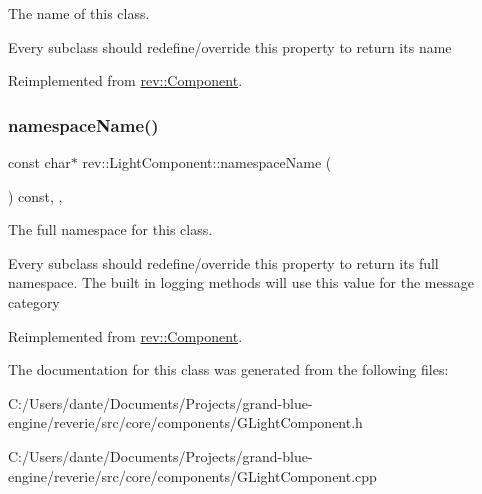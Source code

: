 The name of this class. 

Every subclass should redefine/override this property to return its name 

Reimplemented from \mbox{\hyperlink{classrev_1_1_component_a07619152d5acafe7a536df3a6a476349}{rev\+::\+Component}}.

\mbox{\label{classrev_1_1_light_component_a517a3334919e5cd1aeacdd52c65c90c1}} 
\subsubsection{\texorpdfstring{namespaceName()}{namespaceName()}}
{\footnotesize\ttfamily const char$\ast$ rev\+::\+Light\+Component\+::namespace\+Name (\begin{DoxyParamCaption}{ }\end{DoxyParamCaption}) const\hspace{0.3cm}{\ttfamily [inline]}, {\ttfamily [override]}, {\ttfamily [virtual]}}



The full namespace for this class. 

Every subclass should redefine/override this property to return its full namespace. The built in logging methods will use this value for the message category 

Reimplemented from \mbox{\hyperlink{classrev_1_1_component_ae2827b14c278588b95e01c4743fae674}{rev\+::\+Component}}.



The documentation for this class was generated from the following files\+:\begin{DoxyCompactItemize}
\item 
C\+:/\+Users/dante/\+Documents/\+Projects/grand-\/blue-\/engine/reverie/src/core/components/G\+Light\+Component.\+h\item 
C\+:/\+Users/dante/\+Documents/\+Projects/grand-\/blue-\/engine/reverie/src/core/components/G\+Light\+Component.\+cpp\end{DoxyCompactItemize}
